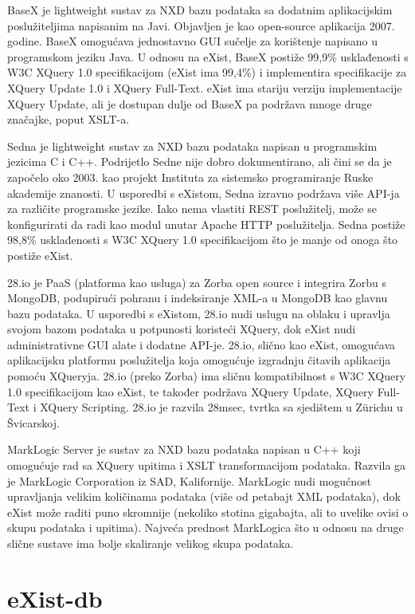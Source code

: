 \documentclass{foi}
\begin{document}
BaseX je lightweight sustav za NXD bazu podataka sa dodatnim aplikacijskim poslužiteljima napisanim na Javi. Objavljen je kao open-source aplikacija 2007. godine. BaseX omogućava jednostavno GUI sučelje za korištenje napisano u programskom jeziku Java. U odnosu na eXist, BaseX postiže 99,9\% usklađenosti s W3C XQuery 1.0 specifikacijom (eXist ima 99,4\%) i implementira specifikacije za XQuery Update 1.0 i XQuery Full-Text. eXist ima stariju verziju implementacije XQuery Update, ali je dostupan dulje od BaseX pa podržava mnoge druge značajke, poput XSLT-a.

Sedna je lightweight sustav za NXD bazu podataka napisan u programskim jezicima C i C++. Podrijetlo Sedne nije dobro dokumentirano, ali čini se da je započelo oko 2003. kao projekt Instituta za sistemsko programiranje Ruske akademije znanosti. U usporedbi s eXistom, Sedna izravno podržava više API-ja za različite programske jezike. Iako nema vlastiti REST poslužitelj, može se konfigurirati da radi kao modul unutar Apache HTTP poslužitelja. Sedna postiže 98,8\% usklađenosti s W3C XQuery 1.0 specifikacijom što je manje od onoga što postiže eXist.

28.io je PaaS (platforma kao usluga) za Zorba open source i integrira Zorbu s MongoDB, podupirući pohranu i indeksiranje XML-a u MongoDB kao glavnu bazu podataka. U usporedbi s eXistom, 28.io nudi uslugu na oblaku i upravlja svojom bazom podataka u potpunosti koristeći XQuery, dok eXist nudi administrativne GUI alate i dodatne API-je. 28.io, slično kao eXist, omogućava aplikacijsku platformu poslužitelja koja omogućuje izgradnju čitavih aplikacija pomoću XQueryja. 28.io (preko Zorba) ima sličnu kompatibilnost s W3C XQuery 1.0 specifikacijom kao eXist, te također podržava XQuery Update, XQuery Full-Text i XQuery Scripting. 28.io je razvila 28msec, tvrtka sa sjedištem u Zürichu u Švicarskoj.

MarkLogic Server je sustav za NXD bazu podataka napisan u C++ koji omogućuje rad sa XQuery upitima i XSLT transformacijom podataka. Razvila ga je MarkLogic Corporation iz SAD, Kalifornije. MarkLogic nudi mogućnost upravljanja velikim količinama podataka (više od petabajt XML podataka), dok eXist može raditi puno skromnije (nekoliko stotina gigabajta, ali to uvelike ovisi o skupu podataka i upitima). Najveća prednost MarkLogica što u odnosu na druge slične sustave ima bolje skaliranje velikog skupa podataka. \cite{exist}

\section{eXist-db}
\end{document}

